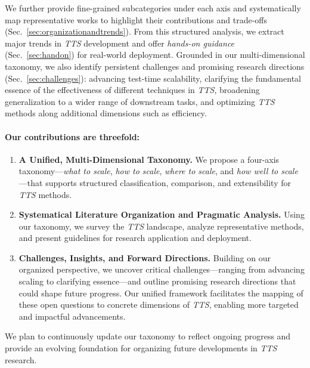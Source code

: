 We further provide fine-grained subcategories under each axis and systematically map representative works to highlight their contributions and trade-offs (Sec.~\ref{sec:organizationandtrends}).
From this structured analysis, we extract major trends in \textit{TTS} development and offer \emph{hands-on guidance} (Sec.~\ref{sec:handon}) for real-world deployment. Grounded in our multi-dimensional taxonomy, we also identify persistent challenges and promising research directions (Sec.~\ref{sec:challenges}): advancing test-time scalability, clarifying the fundamental essence of the effectiveness of different techniques in \textit{TTS}, broadening generalization to a wider range of downstream tasks, and optimizing \textit{TTS} methods along additional dimensions such as efficiency.


\paragraph{Our contributions are threefold:}
\begin{enumerate}
    \item \textbf{A Unified, Multi-Dimensional Taxonomy.} We propose a four-axis taxonomy—\textit{what to scale}, \textit{how to scale}, \textit{where to scale}, and \textit{how well to scale}—that supports structured classification, comparison, and extensibility for \textit{TTS} methods.
    \item \textbf{Systematical Literature Organization and Pragmatic Analysis.} 
    Using our taxonomy, we survey the \textit{TTS} landscape, analyze representative methods, and present guidelines for research application and deployment.
    \item \textbf{Challenges, Insights, and Forward Directions.} Building on our organized perspective, we uncover critical challenges—ranging from advancing scaling to clarifying essence—and outline promising research directions that could shape future progress. Our unified framework facilitates the mapping of these open questions to concrete dimensions of \textit{TTS}, enabling more targeted and impactful advancements.
\end{enumerate}

We plan to continuously update our taxonomy to reflect ongoing progress and provide an evolving foundation for organizing future developments in \textit{TTS} research.